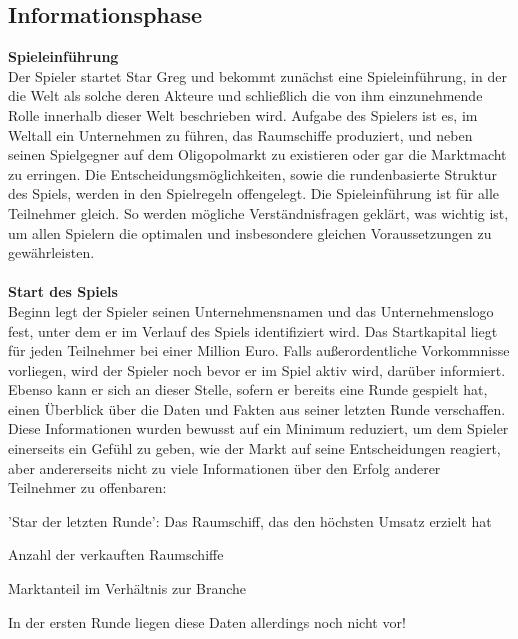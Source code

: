\subsection{Informationsphase}
\label{sub:spielwelt-regeln-informationsphase}



\textbf{Spieleinführung}
\\
Der Spieler startet Star Greg und bekommt zunächst eine Spieleinführung, in der die Welt als solche deren Akteure und schließlich die von ihm einzunehmende Rolle innerhalb dieser Welt beschrieben wird. Aufgabe des Spielers ist es, im Weltall ein Unternehmen zu führen, das Raumschiffe produziert, und neben seinen Spielgegner auf dem Oligopolmarkt zu existieren oder gar die Marktmacht zu erringen. Die Entscheidungsmöglichkeiten, sowie die rundenbasierte Struktur des Spiels, werden in den Spielregeln offengelegt. Die Spieleinführung ist für alle Teilnehmer gleich. So werden mögliche Verständnisfragen geklärt, was wichtig ist, um allen Spielern die optimalen und insbesondere gleichen Voraussetzungen zu gewährleisten. 
\\
\\

\textbf{Start des Spiels}
\\
Beginn legt der Spieler seinen Unternehmensnamen und das Unternehmenslogo fest, unter dem er im Verlauf des Spiels identifiziert wird. Das Startkapital liegt für jeden Teilnehmer bei einer Million Euro. Falls außerordentliche Vorkommnisse vorliegen, wird der Spieler noch bevor er im Spiel aktiv wird, darüber informiert. Ebenso kann er sich an dieser Stelle, sofern er bereits eine Runde gespielt hat, einen Überblick über die Daten und Fakten aus seiner letzten Runde verschaffen. Diese Informationen wurden bewusst auf ein Minimum reduziert, um dem Spieler einerseits ein Gefühl zu geben, wie der Markt auf seine Entscheidungen reagiert, aber andererseits nicht zu viele Informationen über den Erfolg anderer Teilnehmer zu offenbaren:

\begin{seList}
\item 'Star der letzten Runde': Das Raumschiff, das den höchsten Umsatz erzielt hat
\item Anzahl der verkauften Raumschiffe
\item Marktanteil im Verhältnis zur Branche
\end{seList}

In der ersten Runde liegen diese Daten allerdings noch nicht vor! 
